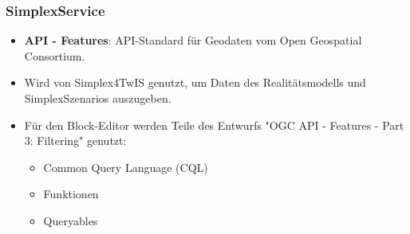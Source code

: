 \begin{frame}
  \frametitle{SimplexService}

  \begin{itemize}
    \item \textbf{API - Features}: API-Standard für Geodaten vom Open Geospatial Consortium.
    \item Wird von Simplex4TwIS genutzt, um Daten des Realitätsmodells und SimplexSzenarios auszugeben.
    \item Für den Block-Editor werden Teile des Entwurfs "OGC API - Features - Part 3: Filtering" genutzt:
          \begin{itemize}
            \item Common Query Language (CQL)
            \item Funktionen
            \item Queryables
          \end{itemize}
  \end{itemize}

\end{frame}
